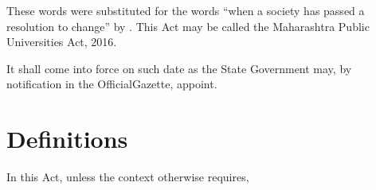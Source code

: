 \documentclass[default]{mhact}
\begin{document}
      \begin{subsectionlist}
    

  \begin{amendins}{These words were substituted for the words ``when a
      society has passed a resolution to change'' by
      .}
    This Act may be called the Maharashtra Public Universities Act,
    2016.
 \end{amendins} 
    

It shall come into force on such date as the State Government may, by notification in the OfficialGazette, appoint.

       \end{subsectionlist}
    
      \section{Definitions}
      
In this Act, unless the context otherwise requires,
\end{document}
